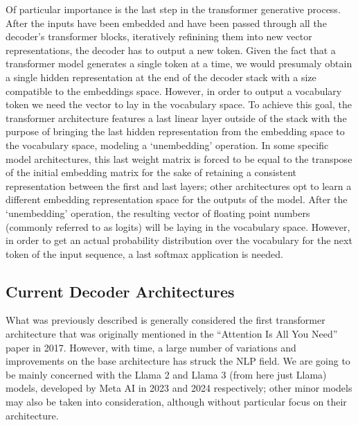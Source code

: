 Of particular importance is the last step in the transformer generative process.
After the inputs have been embedded and have been passed through all the decoder's transformer blocks, iteratively refinining them into new vector representations, the decoder has to output a new token.
Given the fact that a transformer model generates a single token at a time, we would presumaly obtain a single hidden representation at the end of the decoder stack with a size compatible to the embeddings space.
However, in order to output a vocabulary token we need the vector to lay in the vocabulary space.
To achieve this goal, the transformer architecture features a last linear layer outside of the stack with the purpose of bringing the last hidden representation from the embedding space to the vocabulary space, modeling a `unembedding' operation.
In some specific model architectures, this last weight matrix is forced to be equal to the transpose of the initial embedding matrix for the sake of retaining a consistent representation between the first and last layers; other architectures opt to learn a different embedding representation space for the outputs of the model.
After the `unembedding' operation, the resulting vector of floating point numbers (commonly referred to as logits) will be laying in the vocabulary space.
However, in order to get an actual probability distribution over the vocabulary for the next token of the input sequence, a last softmax application is needed.

\subsection{Current Decoder Architectures}

What was previously described is generally considered the first transformer architecture that was originally mentioned in the ``Attention Is All You Need'' \cite{vaswani2017} paper in 2017.
However, with time, a large number of variations and improvements on the base architecture has struck the NLP field.
We are going to be mainly concerned with the Llama 2  and Llama 3  (from here just Llama) models, developed by Meta AI  in 2023 and 2024 respectively; other minor models may also be taken into consideration, although without particular focus on their architecture.

